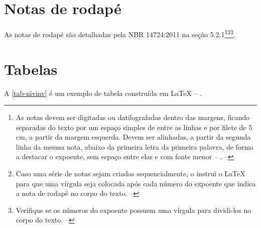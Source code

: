 \section{Notas de rodapé}

As notas de rodapé são detalhadas pela NBR 14724:2011 na seção 5.2.1\footnote{As
    notas devem ser digitadas ou datilografadas dentro das margens, ficando
    separadas do texto por um espaço simples de entre as linhas e por filete de 5
    cm, a partir da margem esquerda. Devem ser alinhadas, a partir da segunda linha
    da mesma nota, abaixo da primeira letra da primeira palavra, de forma a destacar
    o expoente, sem espaço entre elas e com fonte menor -- \showfont
    \textcite[5.2.1]{NBR14724:2011}. -- \showfont}\footnote{Caso uma série de notas sejam
    criadas sequencialmente, o \abnTeX{} instrui o \LaTeX{} para que uma vírgula seja
    colocada após cada número do expoente que indica a nota de rodapé no corpo do
    texto. -- \showfont}\footnote{Verifique se os números do expoente possuem uma vírgula para
    dividi-los no corpo do texto. -- \showfont}.


\section{Tabelas}

A \autoref{tab-nivinv} é um exemplo de tabela construída em
\LaTeX{} -- \showfont.

\begin{table}[htb]
    \caption[Níveis de investigação]{Níveis de investigação. -- \showfont}
    \label{tab-nivinv}
\end{table}



